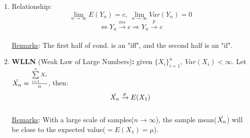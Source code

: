 \documentclass[a4paper,12pt]{article} %
\begin{document}
\begin{enumerate}
{\begin{enumerate}
{\begin{enumerate}
        \item {Converge in Mean Square:  \begin{equation}
        \left \{
        \begin{array}{lr} 
        E[(Y_n-c)^2]\rightarrow 0\ as\  n\rightarrow \infty \Rightarrow Y_n \xrightarrow{ms} c & \\\\ E[(Y_n-Y)^2]\rightarrow 0\ as\  n\rightarrow \infty \Rightarrow Y_n \xrightarrow{ms} Y & 
        \end{array}\right.
        \end{equation}
        }
    \end{enumerate}
    }
    \item {Relationship:  $$
        \lim\limits_{n\rightarrow\infty} E(Y_n)=c,\ 
        \lim\limits_{n\rightarrow\infty} Var(Y_n)=0
        $$
        $$ \Leftrightarrow Y_n \xrightarrow{ms} c \Rightarrow Y_n \xrightarrow{p} c$$ \\
        \underline{Remarks}: The first half of cond. is an "iff", and the second half is an "if".
        }
    \item {{\bf WLLN} (Weak Law of Large Numbers){\bf :} given $\{X_i\}_{i=1}^n,\ Var(X_i)<\infty$. Let $\Bar{X_n}=\frac{\sum\limits_{i=1}^nX_i}{n}$, then: $$ \Bar{X_n} \xrightarrow{p} E(X_1)$$ \\
    \underline{Remarks}: With a large scale of samples($n\rightarrow \infty$), the sample mean($\Bar{X_n}$) will be close to the expected value($=E(X_1)=\mu$).
    
}
\end{enumerate}}
\end{enumerate}
\end{document}
